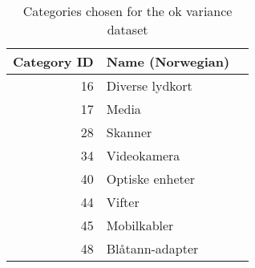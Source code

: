 \begin{table}[h]
\centering
\caption{Categories chosen for the ok variance dataset}
\label{table:dataset-ok_variance_categories}
\begin{tabular}{rll}
\toprule
 Category ID & Name (Norwegian) \\
\midrule
          16 &  Diverse lydkort \\
          17 &            Media \\
          28 &          Skanner \\
          34 &      Videokamera \\
          40 &  Optiske enheter \\
          44 &           Vifter \\
          45 &      Mobilkabler \\
          48 &  Blåtann-adapter \\
\bottomrule
\end{tabular}
\end{table}
